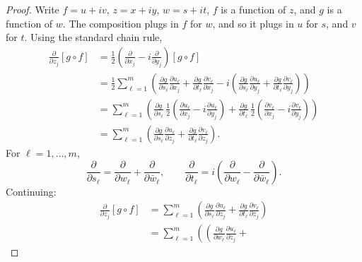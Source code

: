 \documentclass[12pt,openany]{book}
\theoremstyle{plain}
\theoremstyle{remark}
\theoremstyle{definition}
\theoremstyle{exercise}
\theoremstyle{example}
\begin{document}
\begin{proof}
Write $f = u+iv$, $z = x+iy$, $w=s+it$,
$f$ is a function of $z$, and $g$ is a function of $w$.
The composition plugs in $f$ for $w$, and so it plugs in $u$ for $s$, and
$v$ for $t$.
Using the standard chain rule,
\begin{equation*}
\begin{split}
\frac{\partial}{\partial z_j} \left[ g \circ f \right]
& =
\frac{1}{2}
\left(
\frac{\partial}{\partial x_j} - i
\frac{\partial}{\partial y_j}
\right)
 \left[ g \circ f \right]
\\
& = 
\frac{1}{2}
\sum_{\ell=1}^m \left(
\frac{\partial g}{\partial s_\ell} \frac{\partial u_\ell}{\partial x_j}
+
\frac{\partial g}{\partial t_\ell} \frac{\partial v_\ell}{\partial x_j}
-
i
\left(
\frac{\partial g}{\partial s_\ell} \frac{\partial u_\ell}{\partial y_j}
+
\frac{\partial g}{\partial t_\ell} \frac{\partial v_\ell}{\partial y_j}
\right)
\right)
\\
& = 
\sum_{\ell=1}^m \left(
\frac{\partial g}{\partial s_\ell}
\,
\frac{1}{2}
\left(
\frac{\partial u_\ell}{\partial x_j}
-
i
\frac{\partial u_\ell}{\partial y_j}
\right)
+
\frac{\partial g}{\partial t_\ell}
\,
\frac{1}{2}
\left(
\frac{\partial v_\ell}{\partial x_j}
-
i
\frac{\partial v_\ell}{\partial y_j}
\right)
\right)
\\
& = 
\sum_{\ell=1}^m \left(
\frac{\partial g}{\partial s_\ell}
\frac{\partial u_\ell}{\partial z_j}
+
\frac{\partial g}{\partial t_\ell}
\frac{\partial v_\ell}{\partial z_j}
\right) .
\end{split}
\end{equation*}
For $\ell = 1, \ldots, m$,
\begin{equation*}
\frac{\partial}{\partial s_\ell}
=
\frac{\partial}{\partial w_\ell}
+
\frac{\partial}{\partial \bar{w}_\ell} ,
\qquad
\frac{\partial}{\partial t_\ell}
=
i \left(
\frac{\partial}{\partial w_\ell}
-
\frac{\partial}{\partial \bar{w}_\ell}
\right) .
\end{equation*}
Continuing:
\begin{equation*}
\begin{split}
\frac{\partial}{\partial z_j} \left[ g \circ f \right]
& = 
\sum_{\ell=1}^m \left(
\frac{\partial g}{\partial s_\ell}
\frac{\partial u_\ell}{\partial z_j}
+
\frac{\partial g}{\partial t_\ell}
\frac{\partial v_\ell}{\partial z_j}
\right)
\\
& = 
\sum_{\ell=1}^m \left(
\left(
\frac{\partial g}{\partial w_\ell}
\frac{\partial u_\ell}{\partial z_j}
+

\end{split}
\end{equation*}
\end{proof}
\end{document}
